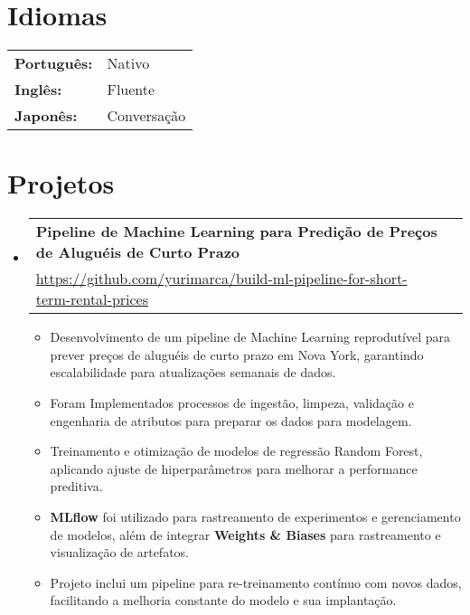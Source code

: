 \documentclass[letterpaper,11pt]{article}
\makeatletter
\newcommand{\resumeProject}[2]{
	\vspace {-1pt}\item
	\begin{tabular*}{0.97\textwidth}{l@{\extracolsep{\fill}}r}
		\textbf{#1}\\
		{\small\href{#2}{#2}} \\
	\end{tabular*}\vspace{-5pt}
}
\newcommand{\resumeSubHeadingListStart}{\begin{itemize}[leftmargin=*]}
\newcommand{\resumeSubHeadingListEnd}{\end{itemize}}
\makeatother
\begin{document}
	\section{Idiomas}
	
	\begin{tabular}{l @{\quad} l}
		\textbf{Português:}&Nativo\\
		\textbf{Inglês:}&Fluente \\
		\textbf{Japonês:}&Conversação \\
	\end{tabular}

\section{Projetos}

\resumeSubHeadingListStart
\resumeProject
{Pipeline de Machine Learning para Predição de Preços de Aluguéis de Curto Prazo}{https://github.com/yurimarca/build-ml-pipeline-for-short-term-rental-prices}
\begin{itemize}
	\item Desenvolvimento de um pipeline de Machine Learning reprodutível para prever preços de aluguéis de curto prazo em Nova York, garantindo escalabilidade para atualizações semanais de dados.
	\item Foram Implementados processos de ingestão, limpeza, validação e engenharia de atributos para preparar os dados para modelagem.
	\item Treinamento e otimização de modelos de regressão Random Forest, aplicando ajuste de hiperparâmetros para melhorar a performance preditiva.
	\item \textbf{MLflow} foi utilizado para rastreamento de experimentos e gerenciamento de modelos, além de integrar \textbf{Weights \& Biases} para rastreamento e visualização de artefatos.
	\item Projeto inclui um pipeline para re-treinamento contínuo com novos dados, facilitando a melhoria constante do modelo e sua implantação.
\end{itemize}

\resumeSubHeadingListEnd

\end{document}
